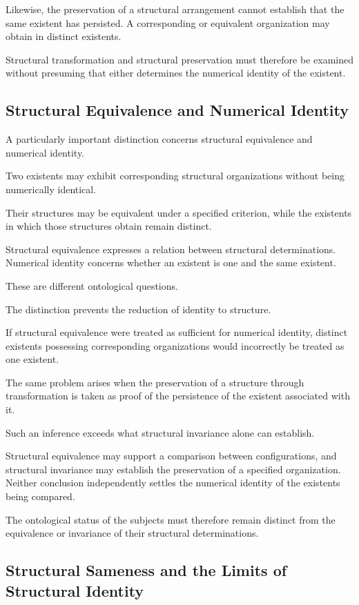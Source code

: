 Likewise, the preservation of a structural
arrangement cannot establish that the same
existent has persisted. A corresponding
or equivalent organization may obtain in
distinct existents.

Structural transformation and structural
preservation must therefore be examined
without presuming that either determines
the numerical identity of the existent.

\subsection{Structural Equivalence and Numerical Identity}

A particularly important distinction concerns
structural equivalence and numerical identity.

Two existents may exhibit corresponding
structural organizations without being
numerically identical.

Their structures may be equivalent under
a specified criterion, while the existents
in which those structures obtain remain
distinct.

Structural equivalence expresses a relation
between structural determinations. Numerical
identity concerns whether an existent is
one and the same existent.

These are different ontological questions.

The distinction prevents the reduction
of identity to structure.

If structural equivalence were treated
as sufficient for numerical identity,
distinct existents possessing corresponding
organizations would incorrectly be treated
as one existent.

The same problem arises when the preservation
of a structure through transformation is
taken as proof of the persistence of the
existent associated with it.

Such an inference exceeds what structural
invariance alone can establish.

Structural equivalence may support a
comparison between configurations, and
structural invariance may establish the
preservation of a specified organization.
Neither conclusion independently settles
the numerical identity of the existents
being compared.

The ontological status of the subjects
must therefore remain distinct from the
equivalence or invariance of their
structural determinations.

\subsection{Structural Sameness and the Limits of Structural Identity}

